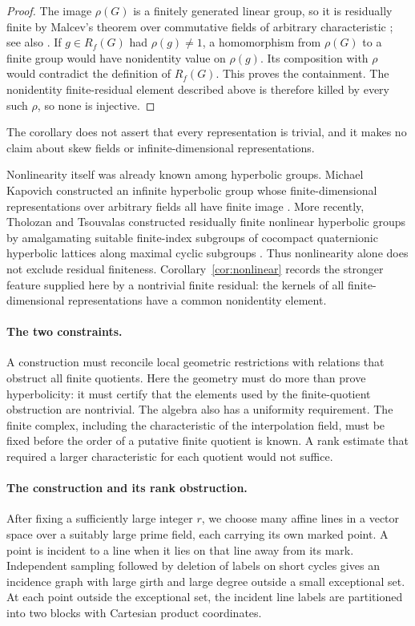 \documentclass[11pt]{article}
\theoremstyle{remark}
\numberwithin{equation}{section}
\begin{document}
\begin{proof}
The image $\rho(G)$ is a finitely generated linear group, so it is residually finite by Malcev's theorem over commutative fields of arbitrary characteristic \cite[Theorems~VII and~VIII]{Malcev1940}; see also \cite[Introduction and \S3]{Nica2013}. If $g\in R_f(G)$ had $\rho(g)\ne 1$, a homomorphism from $\rho(G)$ to a finite group would have nonidentity value on $\rho(g)$. Its composition with $\rho$ would contradict the definition of $R_f(G)$. This proves the containment. The nonidentity finite-residual element described above is therefore killed by every such $\rho$, so none is injective.
\end{proof}

The corollary does not assert that every representation is trivial, and it makes no claim about skew fields or infinite-dimensional representations.

Nonlinearity itself was already known among hyperbolic groups. Michael Kapovich constructed an infinite hyperbolic group whose finite-dimensional representations over arbitrary fields all have finite image \cite[Theorem~8.1]{Kapovich2005}. More recently, Tholozan and Tsouvalas constructed residually finite nonlinear hyperbolic groups by amalgamating suitable finite-index subgroups of cocompact quaternionic hyperbolic lattices along maximal cyclic subgroups \cite[Theorem~1.1]{TT2025}. Thus nonlinearity alone does not exclude residual finiteness. Corollary~\ref{cor:nonlinear} records the stronger feature supplied here by a nontrivial finite residual: the kernels of all finite-dimensional representations have a common nonidentity element.



\paragraph{The two constraints.}
A construction must reconcile local geometric restrictions with relations that obstruct all finite quotients. Here the geometry must do more than prove hyperbolicity: it must certify that the elements used by the finite-quotient obstruction are nontrivial. The algebra also has a uniformity requirement. The finite complex, including the characteristic of the interpolation field, must be fixed before the order of a putative finite quotient is known. A rank estimate that required a larger characteristic for each quotient would not suffice.

\paragraph{The construction and its rank obstruction.}
After fixing a sufficiently large integer $r$, we choose many affine lines in a vector space over a suitably large prime field, each carrying its own marked point. A point is incident to a line when it lies on that line away from its mark. Independent sampling followed by deletion of labels on short cycles gives an incidence graph with large girth and large degree outside a small exceptional set. At each point outside the exceptional set, the incident line labels are partitioned into two blocks with Cartesian product coordinates.
\end{document}
